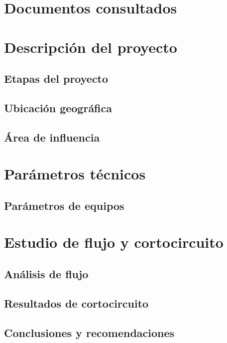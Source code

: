 \documentclass[12pt]{article}
\begin{document}
\section{Documentos consultados}

\section{Descripción del proyecto}

\subsection{Etapas del proyecto}

\subsection{Ubicación geográfica}

\subsection{Área de influencia}

\section{Parámetros técnicos}

\subsection{Parámetros de equipos}

\section{Estudio de flujo y cortocircuito}

\subsection{Análisis de flujo}

\subsection{Resultados de cortocircuito}

\subsection{Conclusiones y recomendaciones}
\end{document}
